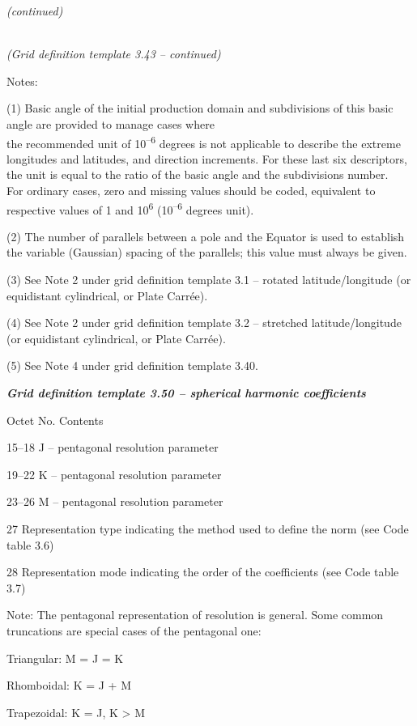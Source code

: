 \emph{(continued)}

\emph{\\
(Grid definition template 3.43 -- continued)}

Notes:

(1) Basic angle of the initial production domain and subdivisions of this basic angle are provided to manage cases where\\
the recommended unit of 10\textsuperscript{--6} degrees is not applicable to describe the extreme longitudes and latitudes, and direction increments. For these last six descriptors, the unit is equal to the ratio of the basic angle and the subdivisions number.\\
For ordinary cases, zero and missing values should be coded, equivalent to respective values of 1 and 10\textsuperscript{6} (10\textsuperscript{--6} degrees unit).

(2) The number of parallels between a pole and the Equator is used to establish the variable (Gaussian) spacing of the parallels; this value must always be given.

(3) See Note 2 under grid definition template 3.1 -- rotated latitude/longitude (or equidistant cylindrical, or Plate Carrée).

(4) See Note 2 under grid definition template 3.2 -- stretched latitude/longitude (or equidistant cylindrical, or Plate Carrée).

(5) See Note 4 under grid definition template 3.40.

\emph{\textbf{Grid definition template 3.50 -- spherical harmonic coefficients}}

Octet No. Contents

15--18 J -- pentagonal resolution parameter

19--22 K -- pentagonal resolution parameter

23--26 M -- pentagonal resolution parameter

27 Representation type indicating the method used to define the norm (see Code table 3.6)

28 Representation mode indicating the order of the coefficients (see Code table 3.7)

Note: The pentagonal representation of resolution is general. Some common truncations are special cases of the pentagonal one:

Triangular: M = J = K

Rhomboidal: K = J + M

Trapezoidal: K = J, K \textgreater{} M

